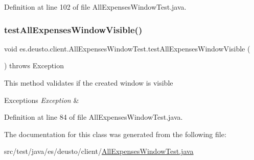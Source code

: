 Definition at line 102 of file All\+Expenses\+Window\+Test.\+java.

\mbox{\label{classes_1_1deusto_1_1client_1_1_all_expenses_window_test_a1eb6a11013fb12fe16453a17e050e81c}} 
\subsubsection{\texorpdfstring{test\+All\+Expenses\+Window\+Visible()}{testAllExpensesWindowVisible()}}
{\footnotesize\ttfamily void es.\+deusto.\+client.\+All\+Expenses\+Window\+Test.\+test\+All\+Expenses\+Window\+Visible (\begin{DoxyParamCaption}{ }\end{DoxyParamCaption}) throws Exception}

This method validates if the created window is visible


\begin{DoxyExceptions}{Exceptions}
{\em Exception} & \\
\hline
\end{DoxyExceptions}


Definition at line 84 of file All\+Expenses\+Window\+Test.\+java.



The documentation for this class was generated from the following file\+:\begin{DoxyCompactItemize}
\item 
src/test/java/es/deusto/client/\hyperlink{_all_expenses_window_test_8java}{All\+Expenses\+Window\+Test.\+java}\end{DoxyCompactItemize}
